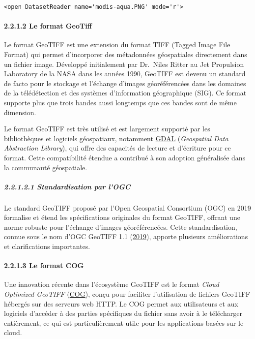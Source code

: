 \documentclass[
]{article}
\begin{document}
\begin{verbatim}
<open DatasetReader name='modis-aqua.PNG' mode='r'>
\end{verbatim}

\paragraph{\texorpdfstring{{2.2.1.2} Le format
GeoTiff}{2.2.1.2 Le format GeoTiff}}\label{le-format-geotiff}

Le format GeoTIFF est une extension du format TIFF (Tagged Image File
Format) qui permet d'incorporer des métadonnées géospatiales directement
dans un fichier image. Développé initialement par Dr.~Niles Ritter au
Jet Propulsion Laboratory de la
\href{https://www.earthdata.nasa.gov/esdis/esco/standards-and-practices/geotiff}{NASA}
dans les années 1990, GeoTIFF est devenu un standard de facto pour le
stockage et l'échange d'images géoréférencées dans les domaines de la
télédétection et des systèmes d'information géographique (SIG). Ce
format supporte plus que trois bandes aussi longtemps que ces bandes
sont de même dimension.

Le format GeoTIFF est très utilisé et est largement supporté par les
bibliothèques et logiciels géospatiaux, notamment
\href{https://gdal.org}{GDAL} (\emph{Geospatial Data Abstraction
Library}), qui offre des capacités de lecture et d'écriture pour ce
format. Cette compatibilité étendue a contribué à son adoption
généralisée dans la communauté géospatiale.

\subparagraph{\texorpdfstring{{2.2.1.2.1} Standardisation par
l'OGC}{2.2.1.2.1 Standardisation par l'OGC}}\label{standardisation-par-logc}

Le standard GeoTIFF proposé par l'Open Geospatial Consortium (OGC) en
2019 formalise et étend les spécifications originales du format GeoTIFF,
offrant une norme robuste pour l'échange d'images géoréférencées. Cette
standardisation, connue sous le nom d'OGC GeoTIFF 1.1
{(\href{references.html\#ref-OGCGeoTIFF}{2019})}, apporte plusieurs
améliorations et clarifications importantes.

\paragraph{\texorpdfstring{{2.2.1.3} Le format
COG}{2.2.1.3 Le format COG}}\label{le-format-cog}

Une innovation récente dans l'écosystème GeoTIFF est le format
\emph{Cloud Optimized GeoTIFF} (\href{http://cogeo.org/}{COG}), conçu
pour faciliter l'utilisation de fichiers GeoTIFF hébergés sur des
serveurs web HTTP. Le COG permet aux utilisateurs et aux logiciels
d'accéder à des parties spécifiques du fichier sans avoir à le
télécharger entièrement, ce qui est particulièrement utile pour les
applications basées sur le cloud.
\end{document}
